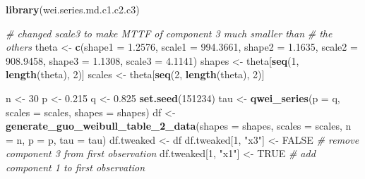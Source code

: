 \documentclass[
]{article}
\newenvironment{Shaded}{\begin{snugshade}}{\end{snugshade}}
\newcommand{\CommentTok}[1]{\textcolor[rgb]{0.56,0.35,0.01}{\textit{#1}}}
\newcommand{\DataTypeTok}[1]{\textcolor[rgb]{0.13,0.29,0.53}{#1}}
\newcommand{\DecValTok}[1]{\textcolor[rgb]{0.00,0.00,0.81}{#1}}
\newcommand{\FloatTok}[1]{\textcolor[rgb]{0.00,0.00,0.81}{#1}}
\newcommand{\KeywordTok}[1]{\textcolor[rgb]{0.13,0.29,0.53}{\textbf{#1}}}
\newcommand{\NormalTok}[1]{#1}
\newcommand{\OtherTok}[1]{\textcolor[rgb]{0.56,0.35,0.01}{#1}}
\newcommand{\StringTok}[1]{\textcolor[rgb]{0.31,0.60,0.02}{#1}}
\begin{document}
\begin{Shaded}
\begin{Highlighting}[]
\KeywordTok{library}\NormalTok{(wei.series.md.c1.c2.c3)}

\CommentTok{\# changed scale3 to make MTTF of component 3 much smaller than}
\CommentTok{\# the others}
\NormalTok{theta \textless{}{-}}\StringTok{ }\KeywordTok{c}\NormalTok{(}\DataTypeTok{shape1 =} \FloatTok{1.2576}\NormalTok{, }\DataTypeTok{scale1 =} \FloatTok{994.3661}\NormalTok{, }\DataTypeTok{shape2 =} \FloatTok{1.1635}\NormalTok{, }\DataTypeTok{scale2 =} \FloatTok{908.9458}\NormalTok{,}
    \DataTypeTok{shape3 =} \FloatTok{1.1308}\NormalTok{, }\DataTypeTok{scale3 =} \FloatTok{4.1141}\NormalTok{)}
\NormalTok{shapes \textless{}{-}}\StringTok{ }\NormalTok{theta[}\KeywordTok{seq}\NormalTok{(}\DecValTok{1}\NormalTok{, }\KeywordTok{length}\NormalTok{(theta), }\DecValTok{2}\NormalTok{)]}
\NormalTok{scales \textless{}{-}}\StringTok{ }\NormalTok{theta[}\KeywordTok{seq}\NormalTok{(}\DecValTok{2}\NormalTok{, }\KeywordTok{length}\NormalTok{(theta), }\DecValTok{2}\NormalTok{)]}

\NormalTok{n \textless{}{-}}\StringTok{ }\DecValTok{30}
\NormalTok{p \textless{}{-}}\StringTok{ }\FloatTok{0.215}
\NormalTok{q \textless{}{-}}\StringTok{ }\FloatTok{0.825}
\KeywordTok{set.seed}\NormalTok{(}\DecValTok{151234}\NormalTok{)}
\NormalTok{tau \textless{}{-}}\StringTok{ }\KeywordTok{qwei\_series}\NormalTok{(}\DataTypeTok{p =}\NormalTok{ q, }\DataTypeTok{scales =}\NormalTok{ scales, }\DataTypeTok{shapes =}\NormalTok{ shapes)}
\NormalTok{df \textless{}{-}}\StringTok{ }\KeywordTok{generate\_guo\_weibull\_table\_2\_data}\NormalTok{(}\DataTypeTok{shapes =}\NormalTok{ shapes, }\DataTypeTok{scales =}\NormalTok{ scales,}
    \DataTypeTok{n =}\NormalTok{ n, }\DataTypeTok{p =}\NormalTok{ p, }\DataTypeTok{tau =}\NormalTok{ tau)}
\NormalTok{df.tweaked \textless{}{-}}\StringTok{ }\NormalTok{df}
\NormalTok{df.tweaked[}\DecValTok{1}\NormalTok{, }\StringTok{"x3"}\NormalTok{] \textless{}{-}}\StringTok{ }\OtherTok{FALSE}  \CommentTok{\# remove component 3 from first observation}
\NormalTok{df.tweaked[}\DecValTok{1}\NormalTok{, }\StringTok{"x1"}\NormalTok{] \textless{}{-}}\StringTok{ }\OtherTok{TRUE}  \CommentTok{\# add component 1 to first observation}


\end{Highlighting}
\end{Shaded}
\end{document}
